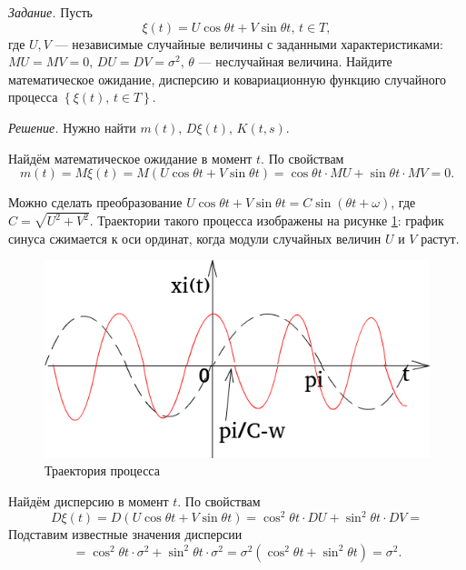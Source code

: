 \textit{Задание.}
Пусть
$$ \xi \left( t \right) =
  U \cos \theta t + V \sin \theta t, \,
  t \in T,$$
где $U, V$ --- независимые случайные величины с заданными характеристиками:
$MU = MV = 0, \, DU = DV = \sigma^2, \, \theta $ --- неслучайная величина.
Найдите математическое ожидание, дисперсию и ковариационную функцию случайного процесса
$ \left\{ \xi \left( t \right), \, t \in T \right\} $.

\textit{Решение.}
Нужно найти $m \left( t \right), \, D \xi \left( t \right), \, K \left( t, s \right) $.

Найдём математическое ожидание в момент $t$.
По свойствам
$$m \left( t \right) =
  M \xi \left( t \right) =
  M \left( U \cos \theta t + V \sin \theta t \right) =
  \cos \theta t \cdot MU + \sin \theta t \cdot MV =
  0.$$

Можно сделать преобразование
$U \cos \theta t + V \sin \theta t = C \sin \left( \theta t + \omega \right) $,
где $C = \sqrt{U^2 + V^2}$.
Траектории такого процесса изображены на рисунке \ref{fig:213}:
график синуса сжимается к оси ординат, когда модули случайных величин $U$ и $V$ растут.

\begin{figure}[h!]
 \centering
 \includegraphics[width=.5\textwidth]{./pictures/2_13.png}
 \caption{Траектория процесса}
 \label{fig:213}
\end{figure}

Найдём дисперсию в момент $t$.
По свойствам
$$D \xi \left( t \right) =
  D \left( U \cos \theta t + V \sin \theta t \right) =
  \cos^2 \theta  t \cdot DU + \sin^2 \theta t \cdot DV =$$
Подставим известные значения дисперсии
$$= \cos^2 \theta t \cdot \sigma^2 + \sin^2 \theta t \cdot \sigma^2 =
  \sigma^2 \left( \cos^2 \theta t + \sin^2 \theta t \right) =
  \sigma^2.$$

